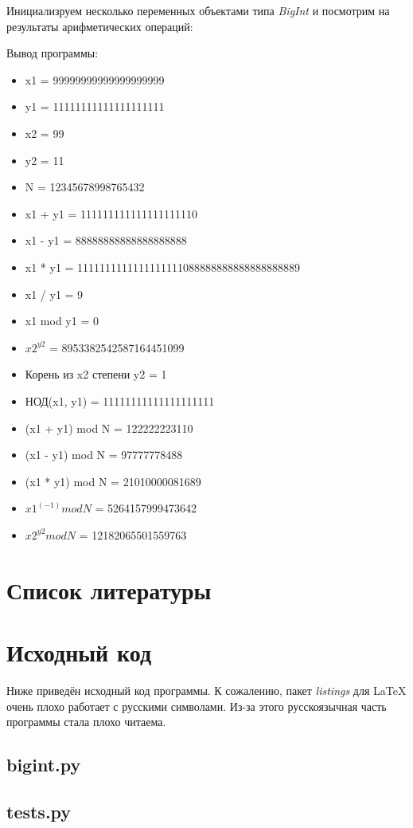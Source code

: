 Инициализруем несколько переменных объектами типа \textit{BigInt} и посмотрим на результаты арифметических операций:



Вывод программы:
\begin{itemize}
    \item x1 = 99999999999999999999
    \item y1 = 11111111111111111111
    \item x2 = 99
    \item y2 = 11
    \item N = 12345678998765432
    \item x1 + y1 = 111111111111111111110
    \item x1 - y1 = 88888888888888888888
    \item x1 * y1 = 1111111111111111111088888888888888888889
    \item x1 / y1 = 9
    \item x1 mod y1 = 0
    \item $x2 ^{y2}$ = 8953382542587164451099
    \item Корень из x2 степени y2 = 1
    \item НОД(x1, y1) = 11111111111111111111
    \item (x1 + y1) mod N = 122222223110
    \item (x1 - y1) mod N = 97777778488
    \item (x1 * y1) mod N = 21010000081689
    \item $x1 ^{(-1)} mod N$ = 5264157999473642
    \item $x2 ^{y2} mod N$ = 12182065501559763
\end{itemize}

\clearpage

\section{Список литературы}

\nocite{*}

\printbibliography[heading=none]

\clearpage

\section{Исходный код}

Ниже приведён исходный код программы. К сожалению, пакет \textit{listings} для \LaTeX{} очень плохо работает с
русскими символами. Из-за этого русскоязычная часть программы стала плохо читаема.

\subsection{bigint.py}

\clearpage

\subsection{tests.py}

\clearpage
